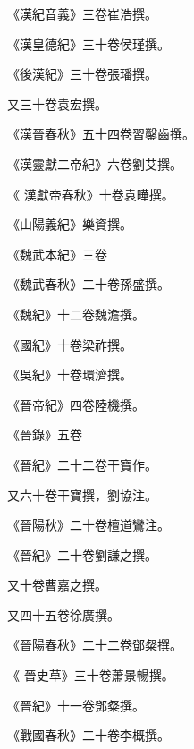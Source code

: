 \begin{pinyinscope}
 《漢紀音義》三卷崔浩撰。



 《漢皇德紀》三十卷侯瑾撰。



 《後漢紀》三十卷張璠撰。



 又三十卷袁宏撰。



 《漢晉春秋》五十四卷習鑿齒撰。



 《漢靈獻二帝紀》六卷劉艾撰。



 《
 漢獻帝春秋》十卷袁曄撰。



 《山陽義紀》樂資撰。



 《魏武本紀》三卷



 《魏武春秋》二十卷孫盛撰。



 《魏紀》十二卷魏澹撰。



 《國紀》十卷梁祚撰。



 《吳紀》十卷環濟撰。



 《晉帝紀》四卷陸機撰。



 《晉錄》五卷



 《晉紀》二十二卷干寶作。



 又六十卷干寶撰，劉協注。



 《晉陽秋》二十卷檀道鸞注。



 《晉紀》二十卷劉謙之撰。



 又十卷曹嘉之撰。



 又四十五卷徐廣撰。



 《晉陽春秋》二十二卷鄧粲撰。



 《
 晉史草》三十卷蕭景暢撰。



 《晉紀》十一卷鄧粲撰。



 《戰國春秋》二十卷李概撰。




\end{pinyinscope}
